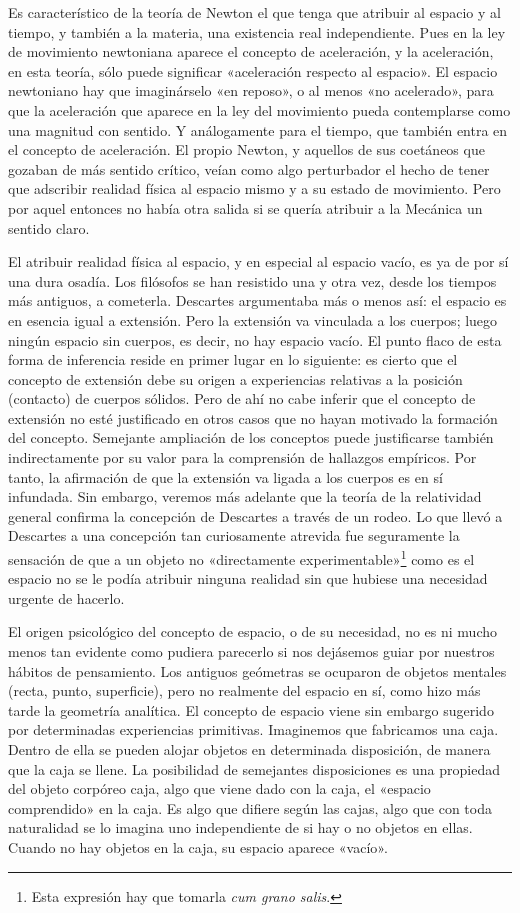 \documentclass[spanish]{book}
\begin{document}
Es característico de la teoría de Newton el que tenga que atribuir al espacio y al
tiempo, y también a la materia, una existencia real independiente. Pues en la ley de
movimiento newtoniana aparece el concepto de aceleración, y la aceleración, en esta
teoría, sólo puede significar «aceleración respecto al espacio». El espacio
newtoniano hay que imaginárselo «en reposo», o al menos «no acelerado», para
que la aceleración que aparece en la ley del movimiento pueda contemplarse
como una magnitud con sentido. Y análogamente para el tiempo, que también
entra en el concepto de aceleración. El propio Newton, y aquellos de sus
coetáneos que gozaban de más sentido crítico, veían como algo perturbador el
hecho de tener que adscribir realidad física al espacio mismo y a su estado de
movimiento. Pero por aquel entonces no había otra salida si se quería atribuir a la
Mecánica un sentido claro.

El atribuir realidad física al espacio, y en especial al espacio vacío, es ya de por sí una
dura osadía. Los filósofos se han resistido una y otra vez, desde los tiempos más
antiguos, a cometerla. Descartes argumentaba más o menos así: el espacio es en esencia
igual a extensión. Pero la extensión va vinculada a los cuerpos; luego ningún espacio
sin cuerpos, es decir, no hay espacio vacío. El punto flaco de esta forma de inferencia
reside en primer lugar en lo siguiente: es cierto que el concepto de extensión debe su
origen a experiencias relativas a la posición (contacto) de cuerpos sólidos. Pero de
ahí no cabe inferir que el concepto de extensión no esté justificado en otros casos que
no hayan motivado la formación del concepto. Semejante ampliación de los conceptos
puede justificarse también indirectamente por su valor para la comprensión de
hallazgos empíricos. Por tanto, la afirmación de que la extensión va ligada a los cuerpos
es en sí infundada. Sin embargo, veremos más adelante que la teoría de la relatividad
general confirma la concepción de Descartes a través de un rodeo. Lo que llevó a
Descartes a una concepción tan curiosamente atrevida fue seguramente la sensación
de que a un objeto no «directamente experimentable»\footnote{Esta expresión hay que 
tomarla \textit{cum grano salis}.} como es el espacio no se le
podía atribuir ninguna realidad sin que hubiese una necesidad urgente de hacerlo.

El origen psicológico del concepto de espacio, o de su necesidad, no es ni mucho
menos tan evidente como pudiera parecerlo si nos dejásemos guiar por nuestros hábitos
de pensamiento. Los antiguos geómetras se ocuparon de objetos mentales (recta, punto,
superficie), pero no realmente del espacio en sí, como hizo más tarde la geometría
analítica. El concepto de espacio viene sin embargo sugerido por determinadas
experiencias primitivas. Imaginemos que fabricamos una caja. Dentro de ella se
pueden alojar objetos en determinada disposición, de manera que la caja se llene. La
posibilidad de semejantes disposiciones es una propiedad del objeto corpóreo caja,
algo que viene dado con la caja, el «espacio comprendido» en la caja. Es algo que
difiere según las cajas, algo que con toda naturalidad se lo imagina uno independiente
de si hay o no objetos en ellas. Cuando no hay objetos en la caja, su espacio aparece
«vacío».
\end{document}
